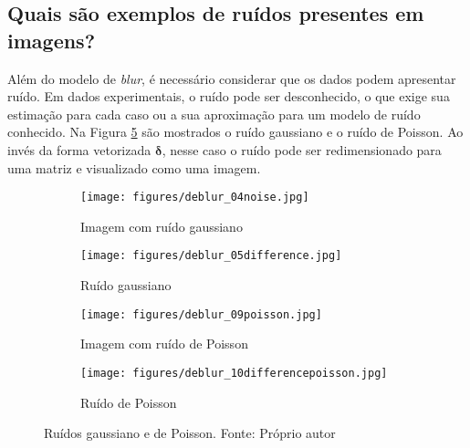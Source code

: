 \subsection{Quais são exemplos de ruídos presentes em imagens?}

Além do modelo de \textit{blur}, é necessário considerar que os dados podem apresentar ruído. Em dados experimentais, o ruído pode ser desconhecido, o que exige sua estimação para cada caso ou a sua aproximação para um modelo de ruído conhecido. Na Figura \ref{fig:01_004} são mostrados o ruído gaussiano e o ruído de Poisson. Ao invés da forma vetorizada $\bm{\delta}$, nesse caso o ruído pode ser redimensionado para uma matriz e visualizado como uma imagem. 

\begin{figure}[H]
     \centering
     \begin{subfigure}[t]{0.4\textwidth}
         \centering
         \texttt{[image: figures/deblur\_04noise.jpg]}
         \caption{Imagem com ruído gaussiano}
         \label{fig:01_004a}
     \end{subfigure}
     \begin{subfigure}[t]{0.4\textwidth}
         \centering
                  \texttt{[image: figures/deblur\_05difference.jpg]}
         \caption{Ruído gaussiano}
         \label{fig:01_004b}
     \end{subfigure}     
     
          \begin{subfigure}[t]{0.4\textwidth}
         \centering
         \texttt{[image: figures/deblur\_09poisson.jpg]}
         \caption{Imagem com ruído de Poisson}
         \label{fig:poissona}
     \end{subfigure}
     \begin{subfigure}[t]{0.4\textwidth}
         \centering
                  \texttt{[image: figures/deblur\_10differencepoisson.jpg]}
         \caption{Ruído de Poisson}
         \label{fig:poissonb}
     \end{subfigure}
     
     
\caption[Ruídos gaussiano e de Poisson.]{Ruídos gaussiano e de Poisson. Fonte: Próprio autor}
\label{fig:01_004}
\end{figure}




